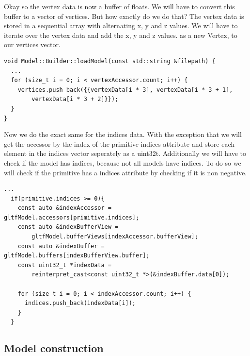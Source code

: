 \documentclass[12pt]{report} \usepackage{preamble}
\begin{document}
Okay so the vertex data is now a buffer of floats. We will have to convert this buffer to a vector of vertices. But how exactly do we do that?
The vertex data is stored in a sequential array with alternating x, y and z values. We will have to iterate over the vertex data and add the x, y and z values.
as a new Vertex, to our vertices vector.

\begin{lstlisting}[Language=C++]
void Model::Builder::loadModel(const std::string &filepath) {
  ...
  for (size_t i = 0; i < vertexAccessor.count; i++) {                                                                                                                                                 
    vertices.push_back({{vertexData[i * 3], vertexData[i * 3 + 1],                                                                   
        vertexData[i * 3 + 2]}});                                                                                                                                                                                
  }  
}
\end{lstlisting}

Now we do the exact same for the indices data. With the exception that we will get the accessor by the index of the primitive indices attribute and
store each element in the indices vector seperately as a uint32\textunderscore t. Additionally we will have to check if the model has indices, because
not all models have indices. To do so we will check if the primitive has a indices attribute by checking if it is non negative.

\begin{lstlisting}[Language=C++]
  ...
  if(primitive.indices >= 0){
    const auto &indexAccessor = gltfModel.accessors[primitive.indices];
    const auto &indexBufferView =
        gltfModel.bufferViews[indexAccessor.bufferView];
    const auto &indexBuffer = gltfModel.buffers[indexBufferView.buffer];
    const uint32_t *indexData =
        reinterpret_cast<const uint32_t *>(&indexBuffer.data[0]);

    for (size_t i = 0; i < indexAccessor.count; i++) {
      indices.push_back(indexData[i]);
    }
  }
\end{lstlisting}

\subsection{Model construction}
\end{document}
